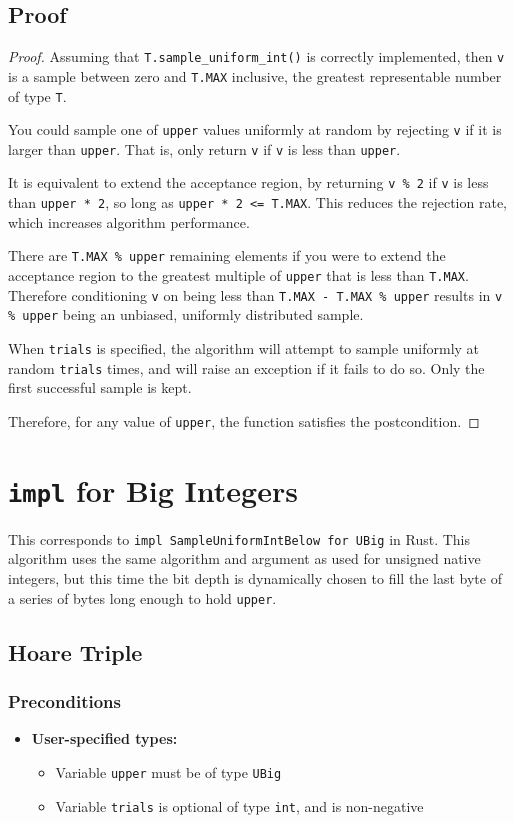 \documentclass{article}
\begin{document}
\subsection{Proof}
\begin{proof} 
\label{unsigned-integer-proof}
Assuming that \texttt{T.sample\_uniform\_int()} is correctly implemented,
then \texttt{v} is a sample between zero and \texttt{T.MAX} inclusive, the greatest representable number of type \texttt{T}.

You could sample one of \texttt{upper} values uniformly at random by rejecting \texttt{v} if it is larger than \texttt{upper}.
That is, only return \texttt{v} if \texttt{v} is less than \texttt{upper}.

It is equivalent to extend the acceptance region, 
by returning \texttt{v \% 2} if \texttt{v} is less than \texttt{upper * 2}, 
so long as \texttt{upper * 2 <= T.MAX}.
This reduces the rejection rate, which increases algorithm performance.

There are \texttt{T.MAX \% upper} remaining elements if you were to 
extend the acceptance region to the greatest multiple of \texttt{upper} that is less than \texttt{T.MAX}.
Therefore conditioning \texttt{v} on being less than \texttt{T.MAX - T.MAX \% upper} 
results in \texttt{v \% upper} being an unbiased, uniformly distributed sample.

When \texttt{trials} is specified, the algorithm will attempt to sample uniformly at random \texttt{trials} times,
and will raise an exception if it fails to do so.
Only the first successful sample is kept.

\noindent Therefore, for any value of \texttt{upper}, the function satisfies the postcondition.
\end{proof}


\section{\texttt{impl} for Big Integers}
This corresponds to \texttt{impl SampleUniformIntBelow for UBig} in Rust.
This algorithm uses the same algorithm and argument as used for unsigned native integers, 
but this time the bit depth is dynamically chosen to fill the last byte of a series of bytes long enough to hold \texttt{upper}.

\subsection{Hoare Triple}
\subsubsection*{Preconditions}
\begin{itemize}
    \item \textbf{User-specified types:}
    \begin{itemize}
        \item Variable \texttt{upper} must be of type \texttt{UBig}
        \item Variable \texttt{trials} is optional of type \texttt{int}, and is non-negative
    \end{itemize}
\end{itemize}
\end{document}
